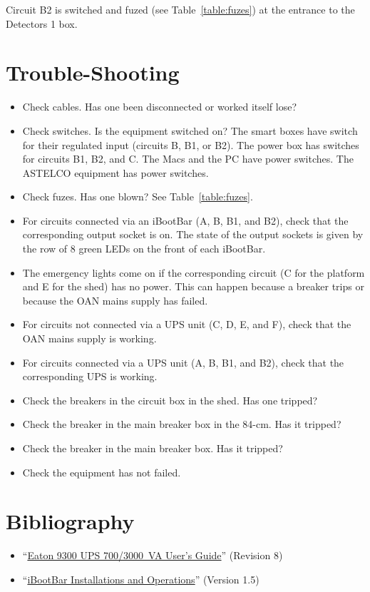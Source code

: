 Circuit B2 is switched and fuzed (see Table~\ref{table:fuzes}) at the entrance to the Detectors 1 box.

\fi

\section{Trouble-Shooting}

\begin{itemize}
\item Check cables. Has one been disconnected or worked itself lose?
\item Check switches. Is the equipment switched on? The smart boxes have switch for their regulated input (circuits B, B1, or B2). The power box has switches for circuits B1, B2, and C. The Macs and the PC have power switches. The ASTELCO equipment has power switches.
\item Check fuzes. Has one blown? See Table~\ref{table:fuzes}.
\item For circuits connected via an iBootBar (A, B, B1, and B2), check that the corresponding output socket is on. The state of the output sockets is given by the row of 8 green LEDs on the front of each iBootBar.
\item The emergency lights come on if the corresponding circuit (C for the platform and E for the shed) has no power. This can happen because a breaker trips or because the OAN mains supply has failed.
\item For circuits not connected via a UPS unit (C, D, E, and F), check that the OAN mains supply is working.
\item For circuits connected via a UPS unit (A, B, B1, and B2), check that the corresponding UPS is working.
\item Check the breakers in the circuit box in the shed. Has one tripped?
\ifcoatli
\item Check the breaker in the main breaker box in the 84-cm. Has it tripped?
\fi
\ifddoti
\item Check the breaker in the main breaker box. Has it tripped?
\fi
\item Check the equipment has not failed.
\end{itemize}

\section{Bibliography}

\begin{flushleft}
\begin{itemize}
\item “\href{bibliography/eaton-9130-ups.pdf}{Eaton 9300 UPS 700/3000~VA User's Guide}” (Revision 8)
\item “\href{bibliography/dataprobe-ibootbar.pdf}{iBootBar Installations and Operations}” (Version 1.5)
\end{itemize}
\end{flushleft}

